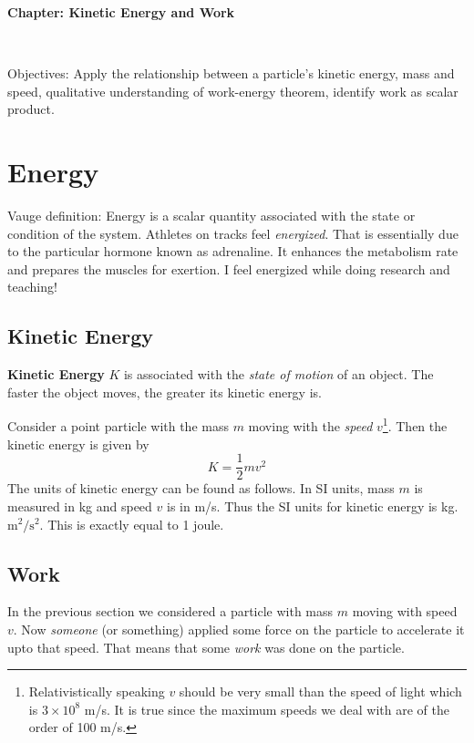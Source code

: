 \documentclass[10pt]{article}
\date{2017-10-11}
\begin{document}
\begin{center}
\begin{Large}\textbf{Chapter: Kinetic Energy and Work}\end{Large} \\
\smallskip
\end{center}
Objectives: Apply the relationship between a particle's kinetic energy, mass and speed, qualitative understanding of work-energy theorem, identify work as scalar product. 
\section{Energy}
Vauge definition: Energy is a scalar quantity associated with the state or condition of the system. 
Athletes on tracks feel \emph{energized}. That is essentially due to the particular hormone known as adrenaline.  It enhances the metabolism rate and prepares the muscles for exertion.  I feel energized while doing research and teaching!


\subsection{Kinetic Energy}
\textbf{Kinetic Energy} $K$ is associated with the \emph{state of motion} of an object.  The faster the object moves, the greater its kinetic energy is.

Consider a  point particle with the mass $m$ moving with the \emph{speed} $v$\footnote{Relativistically speaking $v$ should be very small than the speed of light which is $3\times 10^8$ m/s.  It is true since the maximum speeds we deal with are of the order of 100 m/s.}.  Then the kinetic energy is given by
\begin{equation}
  K = \frac{1}{2}mv^2
\end{equation}
The units of kinetic energy can be found as follows.  In SI units, mass $m$ is measured in kg and speed $v$ is in m/s.  Thus the SI units for kinetic energy is kg.$\text{m}^2/\text{s}^2$.  This is exactly equal to 1 joule.

\subsection{Work}
In the previous section we considered a particle with mass $m$ moving with speed $v$.  Now \emph{someone} (or something) applied some force on the particle to accelerate it upto that speed.  That means that some \emph{work} was done on the particle. 
\end{document}
